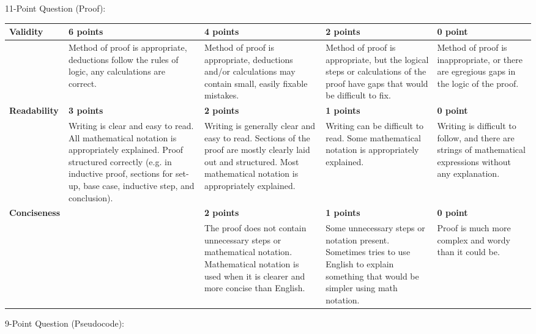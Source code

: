\documentclass[12pt,landscape]{article}
\begin{document}
{\large 11-Point Question (Proof):}


{\renewcommand{\arraystretch}{2}
\begin{tabular}{|p{2.3cm}|p{4.2cm}|p{4.2cm}|p{4.2cm}|p{4.2cm}|}
\hline
{\bf Validity } & {\bf 6 points} & {\bf 4 points} & {\bf 2 points} & {\bf 0 point} \\
\hline
& 
Method of proof is appropriate, deductions follow the rules of logic, any calculations are correct. & 
Method of proof is appropriate, deductions and/or calculations may contain small, easily fixable mistakes. & 
Method of proof is appropriate, but the logical steps or calculations of the proof have gaps that would be difficult to fix. & 
Method of proof is inappropriate, or there are egregious gaps in the logic of the proof.\\
\hline
{\bf Readability } & {\bf 3 points} & {\bf 2 points} & {\bf 1 points} & {\bf 0 point} \\
\hline
& 
 Writing is clear and easy to read. All mathematical notation is appropriately explained. Proof structured correctly (e.g. in inductive proof, sections for set-up, base case, inductive step, and conclusion). & 
 Writing is generally clear and easy to read. Sections of the proof are mostly clearly laid out and structured. Most mathematical notation is appropriately explained.& 
 Writing can be difficult to read. Some mathematical notation is appropriately explained. & 
 Writing is difficult to follow, and there are strings of mathematical expressions without any explanation.\\
\hline
{\bf Conciseness} & & {\bf 2 points} & {\bf 1 points} & {\bf 0 point} \\
\hline
 &

&
The proof does not contain unnecessary steps or mathematical notation. Mathematical notation is used when it is clearer and more concise than English.
&
Some unnecessary steps or notation present. Sometimes tries to use English to explain something that would be simpler using math notation.
&
Proof is much more complex and wordy than it could be.\\
\hline
 \end{tabular}
}




\newpage

{\large 9-Point Question (Pseudocode):}
\end{document}
